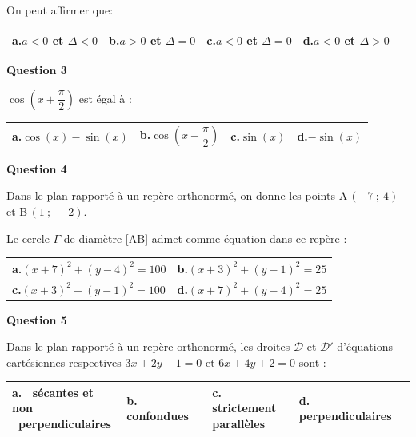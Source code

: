 On peut affirmer que:

\medskip

{\renewcommand{\arraystretch}{1.5}
\begin{tabularx}{\linewidth}{|X|X|X|X|}
\hline
\textbf{a.}\quad $a<0$ et $\Delta<0$
& \textbf{b.}\quad $a>0$ et $\Delta=0$ 
& \textbf{c.}\quad $a<0$ et $\Delta=0$
& \textbf{d.}\quad $a<0$ et $\Delta>0$\\
\hline
\end{tabularx}}

\bigskip

\textbf{Question 3}

\medskip

$\cos \left (x+\dfrac{\pi}{2}\right)$ est égal à :

\medskip

{
\begin{tabularx}{\linewidth}{|X|X|X|X|}
\hline
\textbf{a.}\quad $\cos(x)-\sin(x)$
& \textbf{b.}\quad $\cos \left (x-\dfrac{\pi}{2}\right )$\rule[-10pt]{0pt}{25pt}
& \textbf{c.}\quad $\sin(x)$
& \textbf{d.}\quad $-\sin(x)$\\
\hline
\end{tabularx}}



\textbf{Question 4}

\medskip

Dans le plan rapporté à un repère orthonormé, on donne les points A\,$(-7~;~4)$ et B\,$(1~;~-2)$.

Le cercle $\Gamma$ de diamètre [AB] admet comme équation dans ce repère :

\medskip

{\renewcommand{\arraystretch}{1.5}
\begin{tabularx}{\linewidth}{|X|X|}
\hline
\textbf{a.}\quad $(x+7)^2+(y-4)^2=100$
& \textbf{b.}\quad $(x+3)^2+(y-1)^2=25$\\
\hline
 \textbf{c.}\quad $(x+3)^2+(y-1)^2=100$
& \textbf{d.}\quad $(x+7)^2+(y-4)^2=25$\\
\hline
\end{tabularx}}

\bigskip

\textbf{Question 5}

\medskip

Dans le plan rapporté à un repère orthonormé, les droites $\mathcal{D}$ et $\mathcal{D}'$ d'équations cartésiennes respectives $3x+2y-1=0$  et $6x+4y+2=0$ sont :

\medskip

{\renewcommand{\arraystretch}{3}
\begin{tabularx}{\linewidth}{|X|X|X|X|}
\hline
\shortstack{\textbf{a.}~ sécantes et non\\~perpendiculaires}
& \shortstack{\textbf{b.}~ confondues\\\phantom{confondues}}
& \shortstack{\textbf{c.}~ strictement\\parallèles}
& \shortstack{\textbf{d.}~ perpendiculaires\\\phantom{confondues}}\\
\hline
\end{tabularx}}

\vspace{0.5cm}
